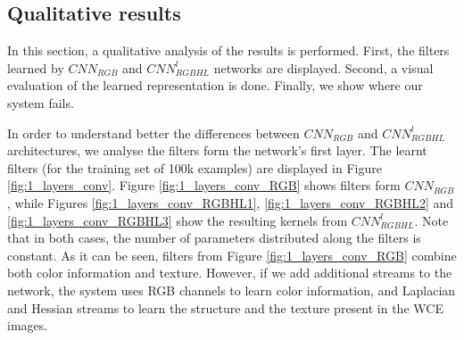 \documentclass[review,12pt,3p]{elsarticle}
\begin{document}
\begin{table}[!ht]
\centering
{}
\caption{Introducing additional information. The numbers represent classification accuracy in percentages.}
\label{tab:fusion}
\end{table}


\subsection{Qualitative results}

In this section, a qualitative analysis of the results is performed. First, the filters learned by $CNN_{RGB}$ and $CNN^l_{RGBHL}$ networks are displayed. Second, a visual evaluation of the learned representation is done. Finally, we show where our system fails.

In order to understand better the differences between $CNN_{RGB}$ and $CNN^l_{RGBHL}$ architectures, we analyse the filters form the network's first layer. The learnt filters (for the training set of 100k examples) are displayed in Figure \ref{fig:1_layers_conv}. Figure \ref{fig:1_layers_conv_RGB} shows filters form $CNN_{RGB}$, while Figures \ref{fig:1_layers_conv_RGBHL1}, \ref{fig:1_layers_conv_RGBHL2} and \ref{fig:1_layers_conv_RGBHL3} show the resulting kernels from $CNN^l_{RGBHL}$. Note that in both cases, the number of parameters distributed along the filters is constant. As it can be seen, filters from Figure \ref{fig:1_layers_conv_RGB} combine both color information and texture. However, if we add additional streams to the network, the system uses RGB channels to learn color information, and Laplacian and Hessian streams to learn the structure and the texture present in the WCE images.
\end{document}
